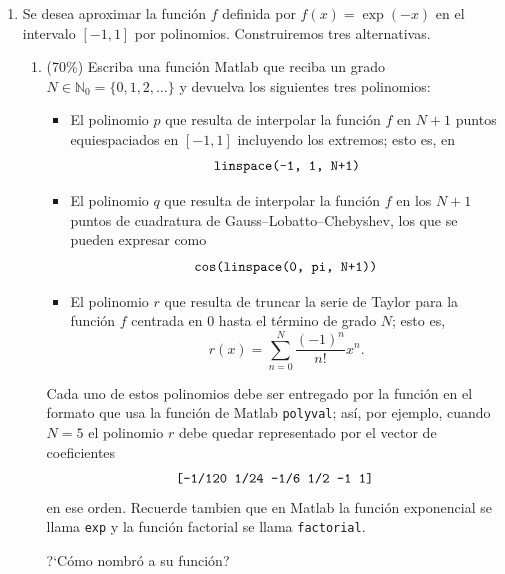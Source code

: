 \documentclass[letter,11pt]{article}
\newcommand{\matlab}{{\sc Matlab} }
\begin{document}
\begin{enumerate}
\item 
Se desea aproximar la funci\'on $f$ definida por $f(x) = \exp(-x)$ en el intervalo $[-1,1]$ por polinomios.
Construiremos tres alternativas.

\begin{enumerate}
\item\label{it:three_polynomials_N} (70\%) Escriba una funci\'on \matlab que reciba un grado $N \in \mathbb{N}_0 = \{0, 1, 2, \dotsc \}$ y
devuelva los siguientes tres polinomios:
\begin{itemize}
\item El polinomio $p$ que resulta de interpolar la funci\'on $f$ en $N+1$ puntos equiespaciados en $[-1,1]$ incluyendo los extremos; esto es, en
%
\begin{equation*}
\text{\texttt{linspace(-1, 1, N+1)}}
\end{equation*}
%
\item El polinomio $q$ que resulta de interpolar la funci\'on $f$ en los $N+1$ puntos de cuadratura de Gauss--Lobatto--Chebyshev, los que se pueden expresar como
%
\begin{equation*}
\text{\texttt{cos(linspace(0, pi, N+1))}}
\end{equation*}
%
\item El polinomio $r$ que resulta de truncar la serie de Taylor para la funci\'on $f$ centrada en $0$ hasta el t\'ermino de grado $N$; esto es,
%
\begin{equation*}
r(x) = \sum_{n=0}^N \frac{(-1)^n}{n!} x^n.
\end{equation*}
%
\end{itemize}
%
Cada uno de estos polinomios debe ser entregado por la funci\'on en el formato que usa la funci\'on de \matlab \texttt{polyval}; as\'i, por ejemplo, cuando $N = 5$ el polinomio $r$ debe quedar representado por el vector de coeficientes
%
\begin{equation*}
\text{\texttt{[-1/120  1/24  -1/6  1/2  -1  1]}}
\end{equation*}
%
en ese orden. Recuerde tambien que en \matlab la funci\'on exponencial se llama \texttt{exp} y la funci\'on factorial se llama \texttt{factorial}.

\medskip
\noindent ?`C\'omo nombr\'o a su funci\'on?\newline
{}


\end{enumerate}
\end{enumerate}
\end{document}
